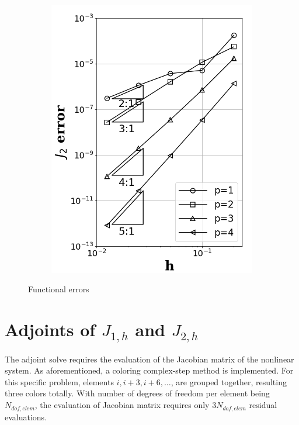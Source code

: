 \documentclass[a4paper]{article}
\begin{document}
\begin{figure}[!htbp]
\begin{subfigure}{0.45\textwidth}
		\label{fig:j1_error}
	\end{subfigure}
	\begin{subfigure}{0.45\textwidth}
		\centering
		\includegraphics[width=1.0\linewidth]{figures/implicit_J2_error.png}
		\label{fig:j2_error}
	\end{subfigure}
	\caption{Functional errors} 
	\label{fig:conv_study}
\end{figure}

\section{Adjoints of $J_{1,h}$ and $J_{2,h}$}
The adjoint solve requires the evaluation of the Jacobian matrix of the nonlinear system. As aforementioned, a coloring complex-step method is implemented. For this specific problem, elements $i, i+3, i+6,\dots$, are grouped together, resulting three colors totally. With number of degrees of freedom per element being $N_{dof,elem}$, the evaluation of Jacobian matrix requires only $3N_{dof,elem}$ residual evaluations. 
\end{document}
